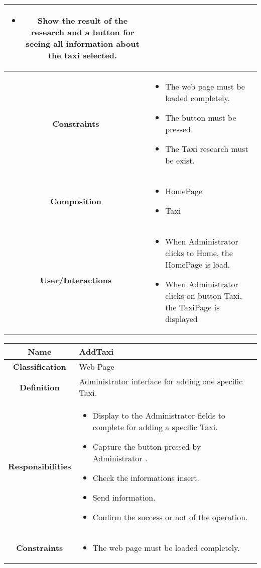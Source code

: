 \documentclass[11pt, a4paper,titlepage]{article}
\begin{document}
\begin{enumerate}
\begin{tabularx}{\textwidth}{| c | X |}
\begin{itemize}
		\item Show the result of the research and a button for seeing all information about the taxi selected.
	\end{itemize}
	\\
	\hline
	\textbf{Constraints} &
	\begin{itemize}
		\item  The web page must be loaded completely.
		\item The button must be pressed.
		\item The Taxi research must be exist.
	\end{itemize}
	\\
	\hline
	\textbf{Composition} &
	\begin{itemize}
		\item HomePage
		\item Taxi
	\end{itemize}
	\\
	\hline
	\textbf{User/Interactions} &
	\begin{itemize}
		\item When Administrator clicks to Home, the HomePage is load.	
		\item When Administrator clicks on button Taxi, the TaxiPage is displayed
	\end{itemize}
	\\
	\hline 
\end{tabularx}
\begin{tabularx}{\textwidth}{| c | X |}
	\hline
	\textbf{Name} &
	AddTaxi
	\\
	\hline
	\textbf{Classification} &
	Web Page
	\\
	\hline
	\textbf{Definition} &
	Administrator interface for adding one specific Taxi.\\
	\hline
	\textbf{Responsibilities} &
	\begin{itemize}
		\item Display to the Administrator fields to complete for adding a specific Taxi.
		\item Capture the button pressed by Administrator .	
		\item Check the informations insert.
		\item Send information.
		\item Confirm the success or not of the operation.
	\end{itemize}
	\\
	\hline
	\textbf{Constraints} &
	\begin{itemize}
		\item The web page must be loaded completely.

\end{itemize}
\end{tabularx}
\end{enumerate}
\end{document}
